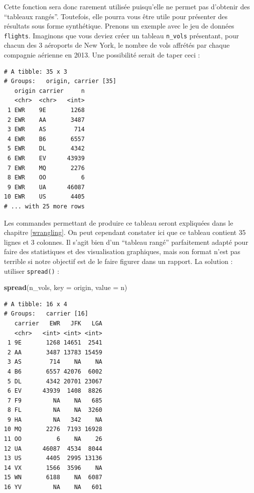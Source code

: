 \documentclass[a4paperpaper,]{article}
\newenvironment{Shaded}{\begin{snugshade}}{\end{snugshade}}
\newcommand{\DataTypeTok}[1]{\textcolor[rgb]{0.00,0.34,0.68}{#1}}
\newcommand{\KeywordTok}[1]{\textcolor[rgb]{0.12,0.11,0.11}{\textbf{#1}}}
\newcommand{\NormalTok}[1]{\textcolor[rgb]{0.12,0.11,0.11}{#1}}
\newcommand{\OperatorTok}[1]{\textcolor[rgb]{0.12,0.11,0.11}{#1}}
\newcommand{\StringTok}[1]{\textcolor[rgb]{0.75,0.01,0.01}{#1}}
\begin{document}
Cette fonction sera donc rarement utilisée puisqu'elle ne permet pas d'obtenir des ``tableaux rangés''. Toutefois, elle pourra vous être utile pour présenter des résultats sous forme synthétique. Prenons un exemple avec le jeu de données \texttt{flights}. Imaginons que vous deviez créer un tableau \texttt{n\_vols} présentant, pour chacun des 3 aéroports de New York, le nombre de vols affrétés par chaque compagnie aérienne en 2013. Une possibilité serait de taper ceci :

\begin{Shaded}
\end{Shaded}

\begin{verbatim}
# A tibble: 35 x 3
# Groups:   origin, carrier [35]
   origin carrier     n
   <chr>  <chr>   <int>
 1 EWR    9E       1268
 2 EWR    AA       3487
 3 EWR    AS        714
 4 EWR    B6       6557
 5 EWR    DL       4342
 6 EWR    EV      43939
 7 EWR    MQ       2276
 8 EWR    OO          6
 9 EWR    UA      46087
10 EWR    US       4405
# ... with 25 more rows
\end{verbatim}

Les commandes permettant de produire ce tableau seront expliquées dans le chapitre \ref{wrangling}. On peut cependant constater ici que ce tableau contient 35 lignes et 3 colonnes. Il s'agit bien d'un ``tableau rangé'' parfaitement adapté pour faire des statistiques et des visualisation graphiques, mais son format n'est pas terrible si notre objectif est de le faire figurer dans un rapport. La solution : utiliser \texttt{spread()} :

\begin{Shaded}
\begin{Highlighting}[]
\KeywordTok{spread}\NormalTok{(n_vols, }\DataTypeTok{key =}\NormalTok{ origin, }\DataTypeTok{value =}\NormalTok{ n)}
\end{Highlighting}
\end{Shaded}

\begin{verbatim}
# A tibble: 16 x 4
# Groups:   carrier [16]
   carrier   EWR   JFK   LGA
   <chr>   <int> <int> <int>
 1 9E       1268 14651  2541
 2 AA       3487 13783 15459
 3 AS        714    NA    NA
 4 B6       6557 42076  6002
 5 DL       4342 20701 23067
 6 EV      43939  1408  8826
 7 F9         NA    NA   685
 8 FL         NA    NA  3260
 9 HA         NA   342    NA
10 MQ       2276  7193 16928
11 OO          6    NA    26
12 UA      46087  4534  8044
13 US       4405  2995 13136
14 VX       1566  3596    NA
15 WN       6188    NA  6087
16 YV         NA    NA   601
\end{verbatim}
\end{document}
